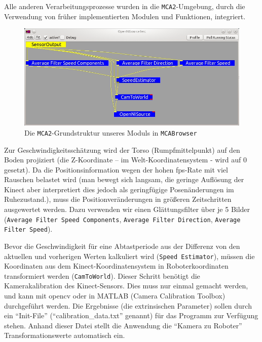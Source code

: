 Alle anderen Verarbeitungsprozesse wurden in die \lstinline{MCA2}-Umgebung,
durch die Verwendung von früher implementierten Modulen und Funktionen, integriert.

\begin{figure}[h]
	\center
	\includegraphics[scale=0.5]{graphics/OpenNISourceTest.jpg}
	\caption{\label{fig:OpenNISourceTest} Die \lstinline{MCA2}-Grundstruktur unseres Moduls in \lstinline{MCABrowser}}
\end{figure}

Zur Geschwindigkeitsschätzung wird der Torso (Rumpfmittelpunkt) auf den Boden projiziert
 (die Z-Koordinate – im Welt-Koordinatensystem - wird auf 0 gesetzt). Da die
 Positionsinformation wegen der hohen \gls{fps}-Rate mit viel Rauschen belastet wird
 (man bewegt sich langsam, die geringe Auflösung der Kinect aber interpretiert
 dies jedoch als geringfügige Posenänderungen im Ruhezustand.), muss die Positionveränderungen
 in größeren Zeitschritten ausgewertet werden. Dazu verwenden wir einen Glättungsfilter über
 je 5 Bilder (\lstinline{Average Filter Speed Components}, \lstinline{Average Filter Direction}, \lstinline{Average Filter Speed}).
 
Bevor die Geschwindigkeit für eine Abtastperiode aus der Differenz von den
aktuellen und vorherigen Werten kalkuliert wird (\lstinline{Speed Estimator}),
müssen die Koordinaten aus dem Kinect-Koordinatensystem in Roboterkoordinaten transformiert werden
 (\lstinline{CamToWorld}). Dieser Schritt benötigt die Kamerakalibration des
 Kinect-Sensors. Dies muss nur einmal gemacht werden, und kann mit \gls{opencv} oder
 in MATLAB (Camera Calibration Toolbox) durchgeführt werden. Die Ergebnisse (die extrinsischen Parameter)
 sollen durch ein ``Init-File'' (``calibration\_data.txt'' genannt) für das
 Programm zur Verfügung stehen.
 Anhand dieser Datei stellt die Anwendung die ``Kamera zu Roboter'' Transformationswerte automatisch ein.
 
